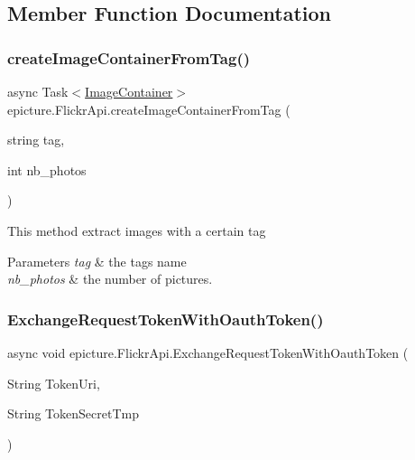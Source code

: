 \subsection{Member Function Documentation}
\mbox{\label{classepicture_1_1_flickr_api_abd70a1f8fe82ddc219572058be51dd51}} 
\subsubsection{\texorpdfstring{create\+Image\+Container\+From\+Tag()}{createImageContainerFromTag()}}
{\footnotesize\ttfamily async Task$<$\mbox{\hyperlink{classepicture_1_1_image_container}{Image\+Container}}$>$ epicture.\+Flickr\+Api.\+create\+Image\+Container\+From\+Tag (\begin{DoxyParamCaption}\item[{string}]{tag,  }\item[{int}]{nb\+\_\+photos }\end{DoxyParamCaption})}

This method extract images with a certain tag 
\begin{DoxyParams}{Parameters}
{\em tag} & the tag\textquotesingle{}s name \\
\hline
{\em nb\+\_\+photos} & the number of pictures. \\
\hline
\end{DoxyParams}
\mbox{\label{classepicture_1_1_flickr_api_af613a836598d8cdccde548b2b4d16c5c}} 
\subsubsection{\texorpdfstring{Exchange\+Request\+Token\+With\+Oauth\+Token()}{ExchangeRequestTokenWithOauthToken()}}
{\footnotesize\ttfamily async void epicture.\+Flickr\+Api.\+Exchange\+Request\+Token\+With\+Oauth\+Token (\begin{DoxyParamCaption}\item[{String}]{Token\+Uri,  }\item[{String}]{Token\+Secret\+Tmp }\end{DoxyParamCaption})\hspace{0.3cm}{\ttfamily [private]}}

